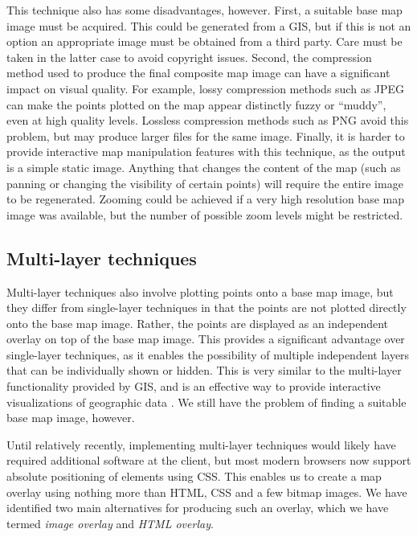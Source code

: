 \documentclass[acmnow]{acmtrans2m}
\begin{document}
This technique also has some disadvantages, however. First, a suitable
base map image must be acquired. This could be generated from a GIS, but
if this is not an option an appropriate image must be obtained from a
third party. Care must be taken in the latter case to avoid copyright
issues. Second, the compression method used to produce the final
composite map image can have a significant impact on visual quality. For
example, lossy compression methods such as JPEG can make the points
plotted on the map appear distinctly fuzzy or ``muddy'',
even at high quality levels. Lossless compression methods such as PNG
avoid this problem, but may produce larger files for the same image.
Finally, it is harder to provide interactive map manipulation features
with this technique, as the output is a simple static image. Anything
that changes the content of the map (such as panning or changing the
visibility of certain points) will require the entire image to be
regenerated. Zooming could be achieved if a very high resolution base
map image was available, but the number of possible zoom levels might be
restricted.




\subsection{Multi-layer techniques}
\label{sec-overlay}

Multi-layer techniques also involve plotting points onto a base map
image, but they differ from single-layer techniques in that the points
are not plotted directly onto the base map image. Rather, the points are
displayed as an independent overlay on top of the base map image. This
provides a significant advantage over single-layer techniques, as it
enables the possibility of multiple independent layers that can be
individually shown or hidden. This is very similar to the multi-layer
functionality provided by GIS, and is an effective way to provide
interactive visualizations of geographic data
\cite{Wood-J-1996-vis,MacE-AM-1998-GIS}. We still have the problem of
finding a suitable base map image, however.

Until relatively recently, implementing multi-layer techniques would likely
have required additional software at the client, but most modern
browsers now support absolute positioning of elements using CSS. This
enables us to create a map overlay using nothing more than HTML, CSS and
a few bitmap images. We have identified two main alternatives for
producing such an overlay, which we have termed \emph{image overlay} and
\emph{HTML overlay}.
\end{document}
